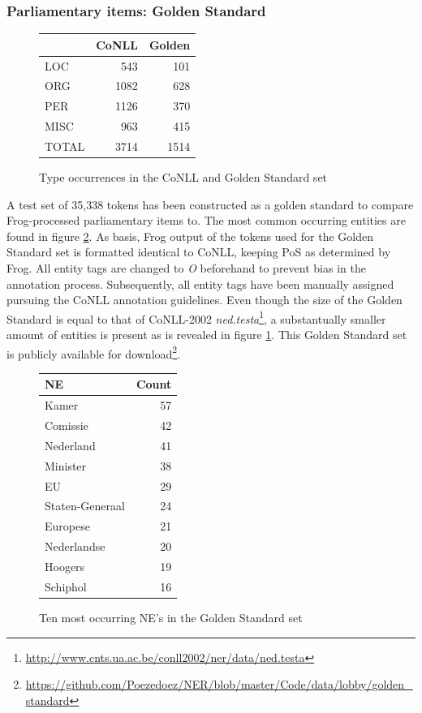 \subsubsection{Parliamentary items: Golden Standard}

\begin{figure}
\begin{center}
\begin{tabular}{l|rr}
& CoNLL & Golden \\\hline
LOC & 543 & 101 \\
ORG & 1082 & 628 \\
PER & 1126 & 370 \\
MISC & 963 & 415 \\\hline
TOTAL & 3714 & 1514 
\end{tabular}
\end{center}
\caption{Type occurrences in the CoNLL and Golden Standard set}
\label{fig:type_occ}
\end{figure}

A test set of 35,338 tokens has been constructed as a golden standard to compare Frog-processed parliamentary items to. The most common occurring entities are found in figure \ref{fig:ne_occ}. As basis, Frog output of the tokens used for the Golden Standard set is formatted identical to CoNLL, keeping PoS as determined by Frog. All entity tags are changed to \textit{O} beforehand to prevent bias in the annotation process. Subsequently, all entity tags have been manually assigned pursuing the CoNLL annotation guidelines. Even though the size of the Golden Standard is equal to that of CoNLL-2002 \textit{ned.testa}\footnote{\url{http://www.cnts.ua.ac.be/conll2002/ner/data/ned.testa}}, a substantually smaller amount of entities is present as is revealed in figure \ref{fig:type_occ}. This Golden Standard set is publicly available for download\footnote{\url{https://github.com/Poezedoez/NER/blob/master/Code/data/lobby/golden_standard}}. 

\begin{figure}
\begin{center}
\begin{tabular}{l|r}
NE & Count \\\hline
Kamer & 57\\
Comissie & 42\\
Nederland & 41 \\
Minister & 38 \\
EU & 29 \\
Staten-Generaal & 24 \\
Europese & 21 \\
Nederlandse & 20 \\
Hoogers & 19 \\
Schiphol & 16 \\
\end{tabular}
\caption{Ten most occurring NE's in the Golden Standard set}
\label{fig:ne_occ}
\end{center}
\end{figure}

